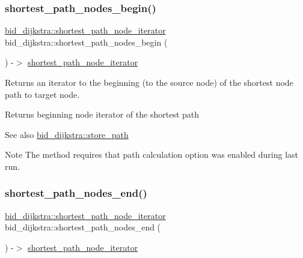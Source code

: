 \subsubsection{\texorpdfstring{shortest\+\_\+path\+\_\+nodes\+\_\+begin()}{shortest\_path\_nodes\_begin()}}
{\footnotesize\ttfamily \mbox{\hyperlink{classbid__dijkstra_ada2e642d9f0582d30fe1dd51c4aa1899}{bid\+\_\+dijkstra\+::shortest\+\_\+path\+\_\+node\+\_\+iterator}} bid\+\_\+dijkstra\+::shortest\+\_\+path\+\_\+nodes\+\_\+begin (\begin{DoxyParamCaption}{ }\end{DoxyParamCaption}) -\/$>$ \mbox{\hyperlink{classbid__dijkstra_ada2e642d9f0582d30fe1dd51c4aa1899}{shortest\+\_\+path\+\_\+node\+\_\+iterator}}}



Returns an iterator to the beginning (to the source node) of the shortest node path to target node. 

\begin{DoxyReturn}{Returns}
beginning node iterator of the shortest path
\end{DoxyReturn}
\begin{DoxySeeAlso}{See also}
\mbox{\hyperlink{classbid__dijkstra_aa095beede9c50b1f1e482049a2a4b619}{bid\+\_\+dijkstra\+::store\+\_\+path}}
\end{DoxySeeAlso}
\begin{DoxyNote}{Note}
The method requires that path calculation option was enabled during last run. 
\end{DoxyNote}
\mbox{\label{classbid__dijkstra_a673043c7caa291e499c055635b31ddff}} 
\subsubsection{\texorpdfstring{shortest\+\_\+path\+\_\+nodes\+\_\+end()}{shortest\_path\_nodes\_end()}}
{\footnotesize\ttfamily \mbox{\hyperlink{classbid__dijkstra_ada2e642d9f0582d30fe1dd51c4aa1899}{bid\+\_\+dijkstra\+::shortest\+\_\+path\+\_\+node\+\_\+iterator}} bid\+\_\+dijkstra\+::shortest\+\_\+path\+\_\+nodes\+\_\+end (\begin{DoxyParamCaption}{ }\end{DoxyParamCaption}) -\/$>$ \mbox{\hyperlink{classbid__dijkstra_ada2e642d9f0582d30fe1dd51c4aa1899}{shortest\+\_\+path\+\_\+node\+\_\+iterator}}}



